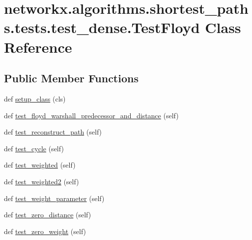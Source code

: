 \hypertarget{classnetworkx_1_1algorithms_1_1shortest__paths_1_1tests_1_1test__dense_1_1TestFloyd}{}\section{networkx.\+algorithms.\+shortest\+\_\+paths.\+tests.\+test\+\_\+dense.\+Test\+Floyd Class Reference}
\label{classnetworkx_1_1algorithms_1_1shortest__paths_1_1tests_1_1test__dense_1_1TestFloyd}
\subsection*{Public Member Functions}
\begin{DoxyCompactItemize}
\item 
def \hyperlink{classnetworkx_1_1algorithms_1_1shortest__paths_1_1tests_1_1test__dense_1_1TestFloyd_ab83c698eb5611dd088c1463ed562005e}{setup\+\_\+class} (cls)
\item 
def \hyperlink{classnetworkx_1_1algorithms_1_1shortest__paths_1_1tests_1_1test__dense_1_1TestFloyd_ad081198ba665c53d5708828da3500fc4}{test\+\_\+floyd\+\_\+warshall\+\_\+predecessor\+\_\+and\+\_\+distance} (self)
\item 
def \hyperlink{classnetworkx_1_1algorithms_1_1shortest__paths_1_1tests_1_1test__dense_1_1TestFloyd_ad3a35d4cc7313345019faf411cffa66c}{test\+\_\+reconstruct\+\_\+path} (self)
\item 
def \hyperlink{classnetworkx_1_1algorithms_1_1shortest__paths_1_1tests_1_1test__dense_1_1TestFloyd_a1fc71d6bb32a5cff778c469db21c47d2}{test\+\_\+cycle} (self)
\item 
def \hyperlink{classnetworkx_1_1algorithms_1_1shortest__paths_1_1tests_1_1test__dense_1_1TestFloyd_aa1a9823f0cca4f6be9ccafb6bec902cf}{test\+\_\+weighted} (self)
\item 
def \hyperlink{classnetworkx_1_1algorithms_1_1shortest__paths_1_1tests_1_1test__dense_1_1TestFloyd_ac118f6909044db8f794e9b37b1dab8ab}{test\+\_\+weighted2} (self)
\item 
def \hyperlink{classnetworkx_1_1algorithms_1_1shortest__paths_1_1tests_1_1test__dense_1_1TestFloyd_ae8fc1084108bfbd84fa2dfc7522fd5f3}{test\+\_\+weight\+\_\+parameter} (self)
\item 
def \hyperlink{classnetworkx_1_1algorithms_1_1shortest__paths_1_1tests_1_1test__dense_1_1TestFloyd_a245ec7c89ac0d6ccef4cb5f7ceba1916}{test\+\_\+zero\+\_\+distance} (self)
\item 
def \hyperlink{classnetworkx_1_1algorithms_1_1shortest__paths_1_1tests_1_1test__dense_1_1TestFloyd_af9d1703b31804eda4ac0e9f3fef9c3cf}{test\+\_\+zero\+\_\+weight} (self)
\end{DoxyCompactItemize}



